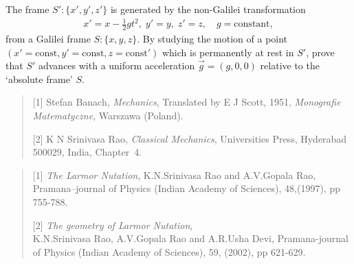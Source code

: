\exise The frame  $S':\{x',y',z'\}$ is 
generated by the non-Galilei transformation
\begin{align}
x'=x-\frac{1}{2}gt^2, \;
y'=y,\;z'=z,\quad g=\text{constant},
\end{align}
from a Galilei frame $S:\{x,  y, z\}$. By studying the 
motion of a point $(x'=\text{const}, 
y'=\text{const},z=\text{const}')$ which is permanently at 
rest in $S'$, prove that $S'$ advances with a uniform 
acceleration $\vec{g}=(g,0,0)$ relative to the `absolute 
frame' $S$.





\begin{quote}
\begin{small}

[1] Stefan Banach, \textsl{Mechanics}, Translated by  
E J Scott, 1951, \textsl{Monografie Matematyczne}, 
   Warszawa (Poland).

[2] K N Srinivasa Rao, \textsl{Classical Mechanics},  
Universities Press, Hyderabad 500029, India,  Chapter~4.
\end{small}
\end{quote}

\newpage

\begin{quote}
\begin{small}


[1] \textsl{The Larmor Nutation}, K.N.Srinivasa Rao and 
A.V.Gopala Rao, Pramana--journal of Physics   (Indian
Academy of Sciences), {48},(1997), pp 755-788.

[2] \textsl{The geometry of Larmor Nutation},\\
K.N.Srinivasa Rao, A.V.Gopala Rao and A.R.Usha Devi, 
Pramana-journal of Physics (Indian  Academy of 
Sciences), 
{59}, (2002), pp 621-629. 
\end{small}
\end{quote}

